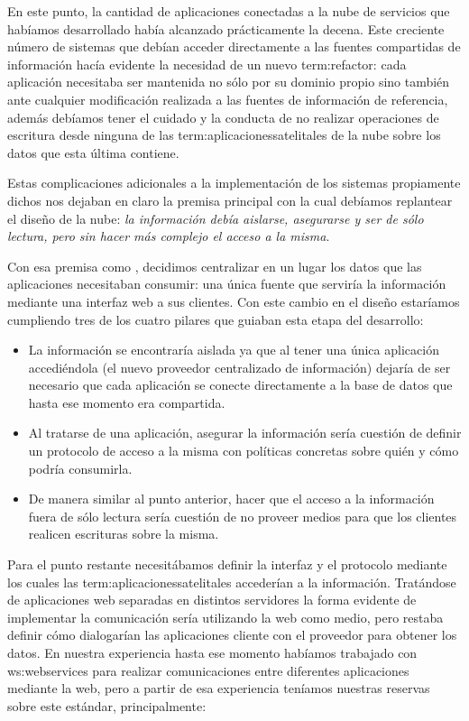 En este punto, la cantidad de aplicaciones conectadas a la nube de servicios que habíamos desarrollado había alcanzado prácticamente la decena. Este creciente número de sistemas que debían acceder directamente a las fuentes compartidas de información hacía evidente la necesidad de un nuevo \gls{term:refactor}: cada aplicación necesitaba ser mantenida no sólo por su dominio propio sino también ante cualquier modificación realizada a las fuentes de información de referencia, además debíamos tener el cuidado y la conducta de no realizar operaciones de escritura desde ninguna de las \gls{term:aplicacionessatelitales} de la nube sobre los datos que esta última contiene.

Estas complicaciones adicionales a la implementación de los sistemas propiamente dichos nos dejaban en claro la premisa principal con la cual debíamos replantear el diseño de la nube: \textit{la información debía aislarse, asegurarse y ser de sólo lectura, pero sin hacer más complejo el acceso a la misma}.

Con esa premisa como , decidimos centralizar en un lugar los datos que las aplicaciones necesitaban consumir: una única fuente que serviría la información mediante una interfaz web a sus clientes. Con este cambio en el diseño estaríamos cumpliendo tres de los cuatro pilares que guiaban esta etapa del desarrollo:

\begin{itemize}
  \item La información se encontraría aislada ya que al tener una única aplicación accediéndola (el nuevo proveedor centralizado de información) dejaría de ser necesario que cada aplicación se conecte directamente a la base de datos que hasta ese momento era compartida.

  \item Al tratarse de una aplicación, asegurar la información sería cuestión de definir un protocolo de acceso a la misma con políticas concretas sobre quién y cómo podría consumirla.

  \item De manera similar al punto anterior, hacer que el acceso a la información fuera de sólo lectura sería cuestión de no proveer medios para que los clientes realicen escrituras sobre la misma.
\end{itemize}

Para el punto restante necesitábamos definir la interfaz y el protocolo mediante los cuales las \gls{term:aplicacionessatelitales} accederían a la información. Tratándose de aplicaciones web separadas en distintos servidores la forma evidente de implementar la comunicación sería utilizando la web como medio, pero restaba definir cómo dialogarían las aplicaciones cliente con el proveedor para obtener los datos. En nuestra experiencia hasta ese momento habíamos trabajado con \glspl{ws:webservice} para realizar comunicaciones entre diferentes aplicaciones mediante la web, pero a partir de esa experiencia teníamos nuestras reservas sobre este estándar, principalmente:

